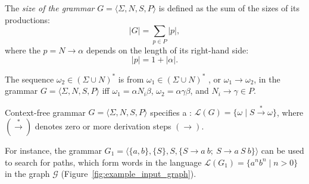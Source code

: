 \begin{definition}

    The \emph{size of the grammar} $G = \langle \Sigma, N, S, P \rangle$ is defined as the sum of the sizes of its productions:
    \[|G| = \sum_{p \in P} |p|,\]
    where the  $p = N \to \alpha$ depends on the length of its right-hand side:
    \[|p| = 1 + |\alpha|.\]

\end{definition}


\begin{definition}
The sequence $\omega_2 \in (\Sigma \cup N)^*$ is  from $\omega_1 \in (\Sigma \cup N)^*$ , or $\omega_1 \to \omega_2$, in the grammar $G = \langle\Sigma, N, S, P\rangle$ iff $\omega_1=\alpha N_i \beta$, $\omega_2 = \alpha \gamma \beta$, and $N_i \to \gamma \in P$.
\end{definition}

\begin{definition}
Context-free grammar $G=\langle\Sigma, N, S, P\rangle$ specifies a : $\mathcal{L}(G) = \{\omega \mid S \xrightarrow{*} \omega \}$, where $(\xrightarrow{*})$ denotes zero or more derivation steps $(\to)$.
\end{definition}

For instance, the grammar $G_1 = \langle \{a,b\}, \{S\}, S, \{S \to a \ b; \ S \to a \ S \ b\} \rangle$ can be used to search for paths, which form words in the language $\mathcal{L}(G_1) = \{a^n b^n \mid n > 0\}$ in the graph $\mathcal{G}$ (Figure~\ref{fig:example_input_graph}).


